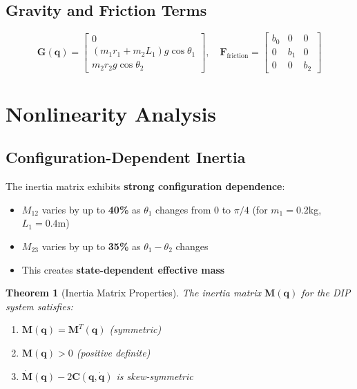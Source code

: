 \documentclass[11pt,a4paper]{article}
\newtheorem{theorem}{Theorem}[section]
\begin{document}
\subsection{Gravity and Friction Terms}

\begin{equation}
    \mathbf{G}(\mathbf{q}) = \begin{bmatrix}
        0 \\
        (m_1 r_1 + m_2 L_1)g \cos\theta_1 \\
        m_2 r_2 g \cos\theta_2
    \end{bmatrix}, \quad
    \mathbf{F}_{\text{friction}} = \begin{bmatrix}
        b_0 & 0 & 0 \\
        0 & b_1 & 0 \\
        0 & 0 & b_2
    \end{bmatrix}
\end{equation}


\section{Nonlinearity Analysis}

\subsection{Configuration-Dependent Inertia}

The inertia matrix exhibits \textbf{strong configuration dependence}:

\begin{itemize}
    \item $M_{12}$ varies by up to \textbf{40\%} as $\theta_1$ changes from 0 to $\pi/4$ (for $m_1=0.2$kg, $L_1=0.4$m)
    \item $M_{23}$ varies by up to \textbf{35\%} as $\theta_1-\theta_2$ changes
    \item This creates \textbf{state-dependent effective mass}
\end{itemize}

\begin{theorem}[Inertia Matrix Properties]
The inertia matrix $\mathbf{M}(\mathbf{q})$ for the DIP system satisfies:
\begin{enumerate}
    \item $\mathbf{M}(\mathbf{q}) = \mathbf{M}^T(\mathbf{q})$ (symmetric)
    \item $\mathbf{M}(\mathbf{q}) > 0$ (positive definite)
    \item $\dot{\mathbf{M}}(\mathbf{q}) - 2\mathbf{C}(\mathbf{q}, \dot{\mathbf{q}})$ is skew-symmetric
\end{enumerate}
\end{theorem}
\end{document}
